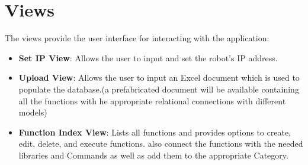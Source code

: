 \section{Views}
The views provide the user interface for interacting with the application:
\begin{itemize}
	\item \textbf{Set IP View}: Allows the user to input and set the robot's IP address.
	\item \textbf{Upload View}: Allows the user to input an Excel document which is used to populate the database.(a prefabricated document will be available containing all the functions with he appropriate relational connections with different models)
	\item \textbf{Function Index View}: Lists all functions and provides options to create, edit, delete, and execute functions.
	also connect the functions with the needed libraries and Commands as well as add them to the appropriate Category.
\end{itemize}